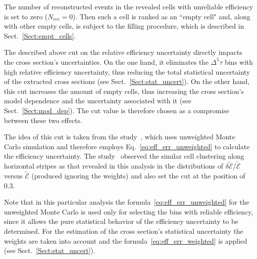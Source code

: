 The number of reconstructed events in the revealed cells with unreliable efficiency is set to zero ($N_{rec} = 0$). Then such a cell is ranked as an ``empty cell" and, along with other empty cells, is subject to the filling procedure, which is described in Sect.~\ref{Sect:empt_cells}. 


The described above cut on the relative efficiency uncertainty directly impacts the cross section's uncertainties. On the one hand, it eliminates the $\Delta^{5} \tau$ bins with high relative efficiency uncertainty, thus reducing the total statistical uncertainty of the extracted cross sections (see Sect.~\ref{Sect:stat_uncert}). On the other hand, this cut increases the amount of empty cells, thus increasing the cross section's model dependence and the uncertainty associated with it (see Sect.~\ref{Sect:mod_dep}). The cut value is therefore chosen as a compromise between these two effects. 


The idea of this cut is taken from the study~\cite{Fed_an_note:2017,Fed_paper_2018}, which uses unweighted Monte Carlo simulation and therefore employs Eq.~\eqref{eq:eff_err_unweighted} to calculate the efficiency uncertainty. The study~\cite{Fed_an_note:2017,Fed_paper_2018} observed the similar cell clustering along horizontal stripes as that revealed in this analysis in the distributions of $\delta \widetilde{\mathcal{E}}/\widetilde{\mathcal{E}}$ versus $\widetilde{\mathcal{E}}$ (produced ignoring the weights) and also set the cut at the position of 0.3. 


Note that in this particular analysis the formula~\eqref{eq:eff_err_unweighted} for the unweighted Monte Carlo is used only for selecting the bins with reliable efficiency, since it allows the pure statistical behavior of the efficiency uncertainty to be determined. For the estimation of the cross section's statistical uncertainty the weights are taken into account and the formula~\eqref{eq:eff_err_weighted} is applied (see Sect.~\ref{Sect:stat_uncert}).




 
